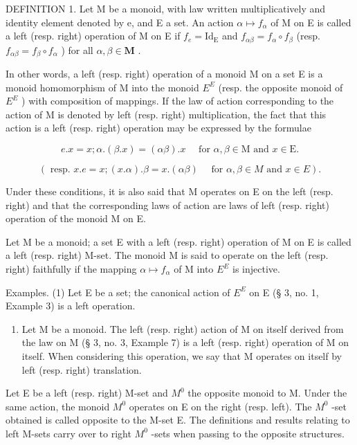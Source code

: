 DEFINITION 1. Let M be a monoid, with law written multiplicatively and identity element denoted by e, and E a set. An action \(\alpha \mapsto f_{\alpha}\) of M on E is called a left (resp. right) operation of M on E if \(f_{e} = \mathrm{Id}_{\mathrm{E}}\) and \(f_{\alpha \beta} = f_{\alpha} \circ f_{\beta}\) (resp. \(f_{\alpha \beta} = f_{\beta} \circ f_{\alpha}\) ) for all \(\alpha, \beta \in \mathbf{M}\) .

In other words, a left (resp. right) operation of a monoid M on a set E is a monoid homomorphism of M into the monoid \(E^{E}\) (resp. the opposite monoid of \(E^{E}\) ) with composition of mappings. If the law of action corresponding to the action of M is denoted by left (resp. right) multiplication, the fact that this action is a left (resp. right) operation may be expressed by the formulae

\[
e. x = x; \alpha . (\beta . x) = (\alpha \beta). x \quad \text { for } \alpha , \beta \in \mathrm{M} \text { and } x \in \mathrm{E}.\tag{1}
\]

\[
(\text { resp. } x. e = x; (x. \alpha). \beta = x. (\alpha \beta) \quad \text { for } \alpha , \beta \in M \text { and } x \in E).
\]

Under these conditions, it is also said that M operates on E on the left (resp. right) and that the corresponding laws of action are laws of left (resp. right) operation of the monoid M on E.

Let M be a monoid; a set E with a left (resp. right) operation of M on E is called a left (resp. right) M-set. The monoid M is said to operate on the left (resp. right) faithfully if the mapping \(\alpha \mapsto f_{\alpha}\) of M into \(E^{E}\) is injective.

Examples. (1) Let E be a set; the canonical action of \(E^{E}\) on E (§ 3, no. 1, Example 3) is a left operation.

\begin{enumerate}
\def\labelenumi{(\arabic{enumi})}
\setcounter{enumi}{1}
\tightlist
\item
  Let M be a monoid. The left (resp. right) action of M on itself derived from the law on M (§ 3, no. 3, Example 7) is a left (resp. right) operation of M on itself. When considering this operation, we say that M operates on itself by left (resp. right) translation.
\end{enumerate}

Let E be a left (resp. right) M-set and \(M^{0}\) the opposite monoid to M. Under the same action, the monoid \(M^{0}\) operates on E on the right (resp. left). The \(M^{0}\) -set obtained is called opposite to the M-set E. The definitions and results relating to left M-sets carry over to right \(M^{0}\) -sets when passing to the opposite structures.

